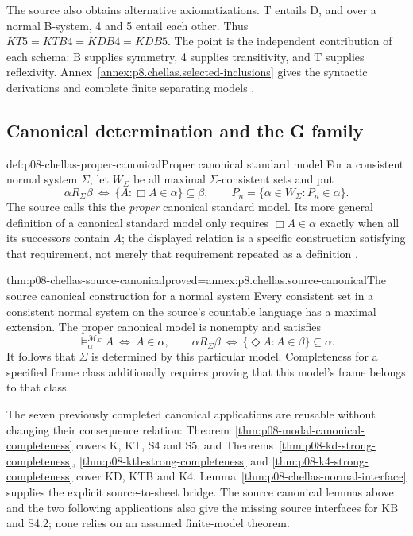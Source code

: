 The source also obtains alternative axiomatizations. T entails D, and
over a normal B-system, 4 and 5 entail each other. Thus
\(KT5=KTB4=KDB4=KDB5\). The point is the independent contribution of
each schema: B supplies symmetry, 4 supplies transitivity, and T supplies
reflexivity. Annex~\ref{annex:p8.chellas.selected-inclusions} gives the
syntactic derivations and complete finite separating models
\cite[\S4.3, thm.~5.2]{Chellas1980}.

\subsection{Canonical determination and the G family}

\begin{hbdefinition}{def:p08-chellas-proper-canonical}{Proper canonical standard model}
For a consistent normal system \(\Sigma\), let \(W_\Sigma\) be all
maximal \(\Sigma\)-consistent sets and put
\[
 \alpha R_\Sigma\beta\ \Longleftrightarrow\
       \{A:\Box A\in\alpha\}\subseteq\beta,
 \qquad P_n=\{\alpha\in W_\Sigma:P_n\in\alpha\}.
\]
The source calls this the \emph{proper} canonical standard model.
Its more general definition of a canonical standard model only requires
\(\Box A\in\alpha\) exactly when all its successors contain \(A\);
the displayed relation is a specific construction satisfying that
requirement, not merely that requirement repeated as a definition
\cite[defs.~5.5, 5.9]{Chellas1980}.
\end{hbdefinition}

\begin{hblemma}{thm:p08-chellas-source-canonical}{proved=annex:p8.chellas.source-canonical}{The source canonical construction for a normal system}
Every consistent set in a consistent normal system on the source's
countable language has a maximal extension. The proper canonical model
is nonempty and satisfies
\[
 \models_\alpha^{\mathcal M_\Sigma}A\ \Longleftrightarrow\ A\in\alpha,
 \qquad
 \alpha R_\Sigma\beta\ \Longleftrightarrow\
       \{\Diamond A:A\in\beta\}\subseteq\alpha.
\]
It follows that \(\Sigma\) is determined by this particular model.
Completeness for a specified frame class additionally requires proving
that this model's frame belongs to that class.
\end{hblemma}

The seven previously completed canonical applications are reusable
without changing their consequence relation:
Theorem~\ref{thm:p08-modal-canonical-completeness} covers K, KT, S4
and S5, and Theorems~\ref{thm:p08-kd-strong-completeness},
\ref{thm:p08-ktb-strong-completeness} and
\ref{thm:p08-k4-strong-completeness} cover KD, KTB and K4.
Lemma~\ref{thm:p08-chellas-normal-interface} supplies the explicit
source-to-sheet bridge. The source canonical lemmas above and the two
following applications also give the missing source interfaces for KB
and S4.2; none relies on an assumed finite-model theorem.

